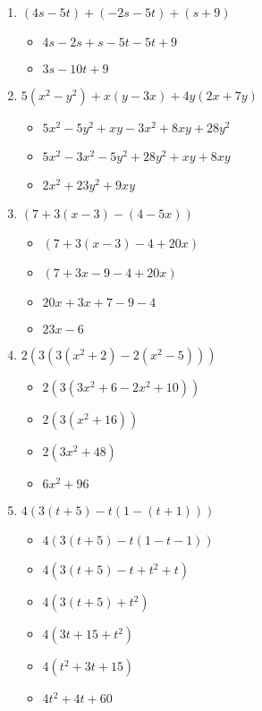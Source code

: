 \documentclass{article}
\begin{document}
\begin{onehalfspace}
\begin{enumerate}
    \item $(4s - 5t) + (-2s - 5t) + (s + 9)$
    \begin{itemize}
        \item $4s - 2s + s - 5t - 5t + 9$
        \item $3s - 10t + 9$
    \end{itemize}

    \item $5(x^{2} - y^{2}) + x(y - 3x) + 4y(2x + 7y)$
    \begin{itemize}
        \item $5x^{2} - 5y^{2} + xy - 3x^{2} + 8xy + 28y^{2}$
        \item $5x^{2} - 3x^{2} - 5y^{2} + 28y^{2} + xy + 8xy$
        \item $2x^{2} + 23y^{2} + 9xy$
    \end{itemize}

    \item $(7 + 3(x - 3) - (4 - 5x))$
    \begin{itemize}
        \item $(7 + 3(x - 3) - 4 + 20x)$
        \item $(7 + 3x - 9 - 4 + 20x)$
        \item $20x + 3x + 7 - 9 - 4$
        \item $23x - 6$
    \end{itemize}

    \item $2(3(3(x^{2} + 2) - 2(x^{2} - 5)))$
    \begin{itemize}
        \item $2(3(3x^{2} + 6 - 2x^{2} + 10))$
        \item $2(3(x^{2} + 16))$
        \item $2(3x^{2} + 48)$
        \item $6x^{2} + 96$
    \end{itemize}

    \item $4(3(t + 5) - t(1 - (t + 1)))$
    \begin{itemize}
        \item $4(3(t + 5) - t(1 - t - 1))$
        \item $4(3(t + 5) - t + t^{2} + t)$
        \item $4(3(t + 5) + t^{2})$
        \item $4(3t + 15 + t^{2})$
        \item $4(t^{2} + 3t + 15)$
        \item $4t^{2} + 4t + 60$
    \end{itemize}


\end{enumerate}
\end{onehalfspace}
\end{document}
